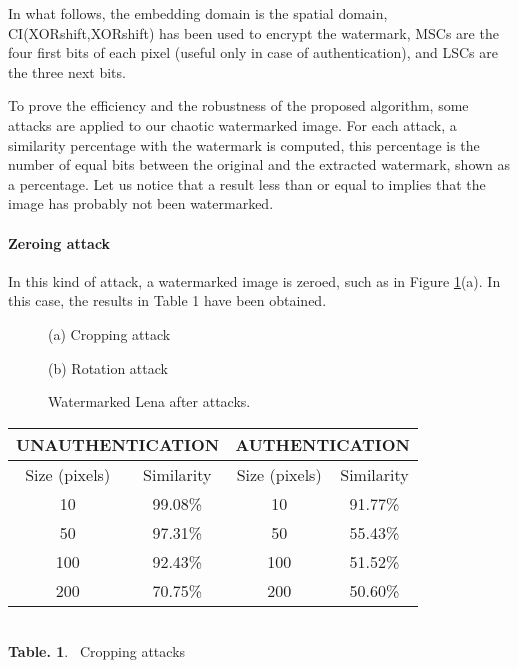 \documentclass[journal]{IEEEtran}
\begin{document}
In what follows, the embedding domain is the spatial domain, CI(XORshift,XORshift) has been used to encrypt the watermark, MSCs are the four first bits of each pixel (useful only in case of authentication), and LSCs are the three next bits.

To prove the efficiency and the robustness of the proposed algorithm, some
attacks are applied to our chaotic watermarked image. For each attack, a
similarity percentage with the watermark is computed, this percentage is the
number of equal bits between the original and the extracted watermark, shown
as a percentage. Let us notice that a result less than or equal to 
implies that the image has probably not been watermarked.

\paragraph{Zeroing attack}

In this kind of attack, a watermarked image is zeroed, such as in Figure \ref{fig:LenaAttack}(a). In this case, the results in Table 1 have been obtained.

\begin{figure}[htb]
\begin{minipage}[b]{.48\linewidth}
  \centering
 \centerline{}
  \centerline{(a) Cropping attack}
\end{minipage}
\hfill
\begin{minipage}[b]{0.48\linewidth}
  \centering
 \centerline{}
  \centerline{(b) Rotation attack}
\end{minipage}
\caption{Watermarked Lena after attacks.}
\label{fig:LenaAttack}
\end{figure}




\begin{center}
\begin{footnotesize}
\begin{tabular}{|c|c||c|c|}
\hline
\multicolumn{2}{|c||}{UNAUTHENTICATION}  & \multicolumn{2}{c|}{AUTHENTICATION}\\ 
\hline
Size (pixels) & Similarity & Size (pixels) & Similarity \\
 \hline
10 & 99.08\% & 10 & 91.77\% \\
50 & 97.31\% & 50 & 55.43\% \\
100 & 92.43\% & 100 & 51.52\% \\
200 & 70.75\% & 200 & 50.60\% \\
\hline
\end{tabular}
\end{footnotesize}\\
\vspace{0.5cm}
\textbf{Table. 1}. ~Cropping attacks
\end{center}
\end{document}
